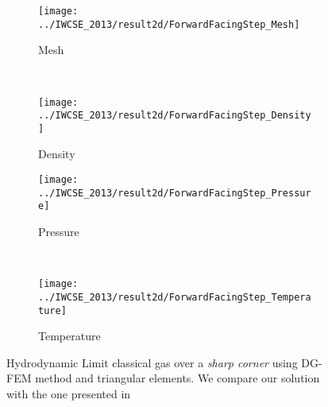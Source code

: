 \begin{frame}
	\begin{figure}
        \centering
        \begin{subfigure}[b]{0.45\textwidth}
                \centering
                \texttt{[image: ../IWCSE\_2013/result2d/ForwardFacingStep\_Mesh]}
                \caption{Mesh}
                \label{FFS_mesh}
        \end{subfigure}%
				~
        \begin{subfigure}[b]{0.45\textwidth}
                \centering
                \texttt{[image: ../IWCSE\_2013/result2d/ForwardFacingStep\_Density]}
                \caption{Density}
                \label{fig:FFS_Density}
        \end{subfigure}
				
        \begin{subfigure}[b]{0.45\textwidth}
								\centering
                \texttt{[image: ../IWCSE\_2013/result2d/ForwardFacingStep\_Pressure]}
                \caption{Pressure}
                \label{fig:FFS_Pressure}
        \end{subfigure}
				~
        \begin{subfigure}[b]{0.45\textwidth}
								\centering
                \texttt{[image: ../IWCSE\_2013/result2d/ForwardFacingStep\_Temperature]}
                \caption{Temperature}
                \label{fig:FFS_temperaute}
        \end{subfigure}
				\caption{Hydrodynamic Limit classical gas over a \emph{sharp corner} using DG-FEM method and triangular elements. We compare our solution with the one presented in \cite{Qiu:2005:RDG:1046640.1046665}}
				\label{fig:FFD_DG-FEM}
\end{figure}
\end{frame}